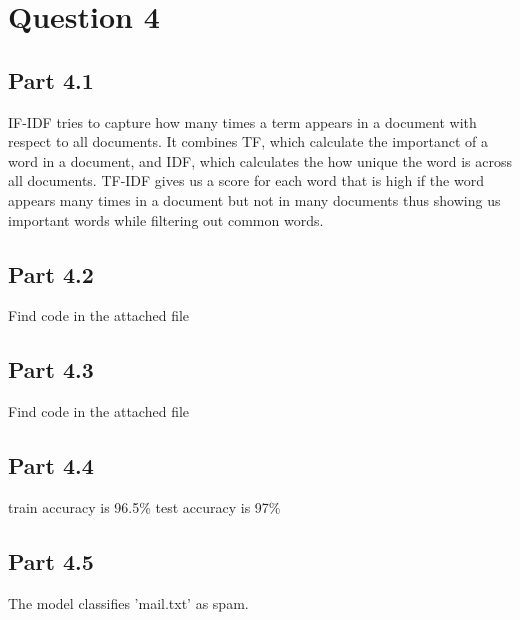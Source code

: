 \documentclass{article}
\begin{document}
\section{Question 4}

\subsection{Part 4.1}
IF-IDF tries to capture how many times a term appears in a document with respect to all documents.
It combines TF, which calculate the importanct of a word in a document, and IDF, which calculates the
how unique the word is across all documents. TF-IDF gives us a score for each word that is high if the word
appears many times in a document but not in many documents thus showing us important words while
filtering out common words.

\subsection{Part 4.2}
Find code in the attached file

\subsection{Part 4.3}
Find code in the attached file

\subsection{Part 4.4}
train accuracy is 96.5\%
test accuracy is 97\%

\subsection{Part 4.5}
The model classifies 'mail.txt' as spam.
\end{document}
